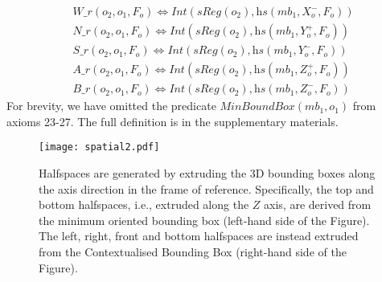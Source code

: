 \documentclass{article}
\begin{document}
\begin{align}
   & \textit{W\_r} (o_2,o_1,F_o) \Leftrightarrow   \textit{Int}(\textit{sReg}(o_2),\textit{hs}(mb_1,X_{o}^{-},F_o)) \\
   & \textit{N\_r} (o_2,o_1,F_o) \Leftrightarrow   \textit{Int}(\textit{sReg}(o_2),\textit{hs}(mb_1,Y_{o}^{+},F_o)) \\
    &    \textit{S\_r} (o_2,o_1,F_o) \Leftrightarrow   \textit{Int}(\textit{sReg}(o_2),\textit{hs}(mb_1,Y_{o}^{-},F_o)) \\
    & \textit{A\_r} (o_2,o_1, F_o) \Leftrightarrow  \textit{Int}(\textit{sReg}(o_2),\textit{hs}(mb_1,Z_{o}^{+},F_o)) \\
    & \textit{B\_r} (o_2,o_1,F_o) \Leftrightarrow   \textit{Int}(\textit{sReg}(o_2),\textit{hs}(mb_1,Z_{o}^{-},F_o))
\end{align}
For brevity, we have omitted the predicate $\textit{MinBoundBox}(mb_1,o_1)$ from axioms 23-27. The full definition is in the supplementary materials.
\begin{figure*}[t]
  \texttt{[image: spatial2.pdf]}
  \caption{Halfspaces are generated by extruding the 3D bounding boxes along the axis direction in the frame of reference. Specifically, the top and bottom halfspaces, i.e., extruded along the $Z$ axis, are derived from the minimum oriented bounding box (left-hand side of the Figure). The left, right, front and bottom halfspaces are instead extruded from the Contextualised Bounding Box (right-hand side of the Figure).}
  \label{fig:hs} 
\end{figure*}
\end{document}

